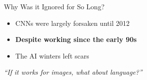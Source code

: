 \begin{frame}{Why Was it Ignored for So Long?}
    \begin{itemize}
        \item CNNs were largely forsaken until 2012
        \item \textbf{Despite working since the early 90s}
        \item The AI winters left scars
    \end{itemize}
    
    \vspace{1em}
    \textit{``If it works for images, what about language?''}
\end{frame}
